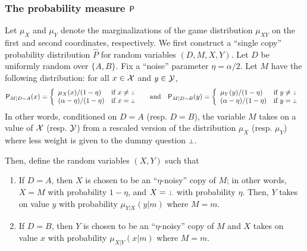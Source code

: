 

\subsubsection{The probability measure $\P$} 
Let $\mu_X$ and $\mu_Y$ denote the marginalizations of the game distribution $\mu_{XY}$ on the first and second coordinates, respectively. 
We first construct a ``single copy'' probability distribution $\hat{P}$ for random variables $(D,M,X,Y)$. Let $D$ be uniformly random over $\{A,B\}$. Fix a ``noise'' parameter $\eta = \alpha/2$. Let $M$ have the following distribution: for all $x \in \X$ and $y \in \Y$,
\[
	\P_{M | D = A}(x) = \left\{
	\begin{array}{ll}
		\mu_X(x)/(1 - \eta)  & \mbox{if $x \neq \dummy$} \\
		(\alpha - \eta)/(1 - \eta) & \mbox{if $x = \dummy$ }
	\end{array}
\right. \quad \text{and} \quad
	\P_{M | D = B}(y) = \left\{
	\begin{array}{ll}
		\mu_Y(y)/(1 - \eta)  & \mbox{if $y \neq \dummy$} \\
		(\alpha - \eta)/(1 - \eta) & \mbox{if $y = \dummy$ }
	\end{array}
\right.
\]
In other words, conditioned on $D=A$ (resp. $D = B$), the variable $M$ takes on a value of $\X$ (resp. $\Y$) from a rescaled version of the distribution $\mu_X$ (resp. $\mu_Y$) where less weight is given to the dummy question $\dummy$.

Then, define the random variables $(X,Y)$ such that 
\begin{enumerate}
	\item If $D = A$, then $X$ is chosen to be an ``$\eta$-noisy'' copy of $M$; in other words, $X = M$ with probability $1 - \eta$, and $X = \dummy$ with probability $\eta$. Then, $Y$ takes on value $y$ with probability $\mu_{Y|X}(y | m)$ where $M = m$. 
	\item If $D = B$, then $Y$ is chosen to be an ``$\eta$-noisy'' copy of $M$ and $X$ takes on value $x$ with probability $\mu_{X|Y}(x | m)$ where $M = m$. 
\end{enumerate}


